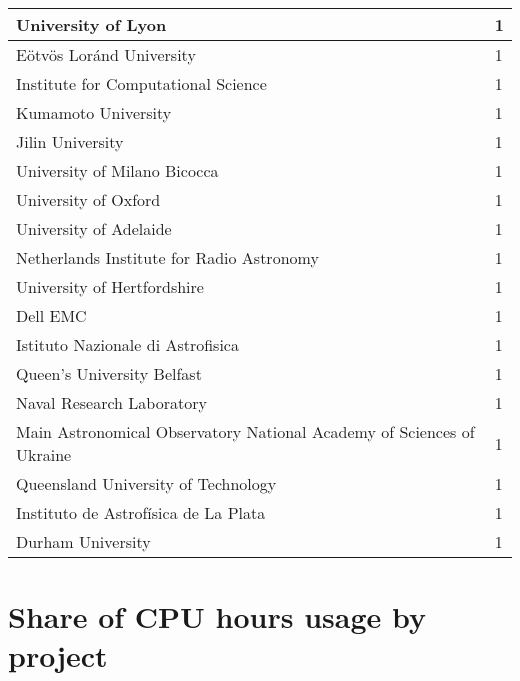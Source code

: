 \documentclass{article}%
\begin{document}
\begin{longtabu}{X[l] X[r]}
University of Lyon&1\\%
\hline%
Eötvös Loránd University&1\\%
\hline%
Institute for Computational Science&1\\%
\hline%
Kumamoto University&1\\%
\hline%
Jilin University&1\\%
\hline%
University of Milano Bicocca&1\\%
\hline%
University of Oxford&1\\%
\hline%
University of Adelaide&1\\%
\hline%
Netherlands Institute for Radio Astronomy&1\\%
\hline%
University of Hertfordshire&1\\%
\hline%
Dell EMC&1\\%
\hline%
Istituto Nazionale di Astrofisica&1\\%
\hline%
Queen's University Belfast&1\\%
\hline%
Naval Research Laboratory&1\\%
\hline%
Main Astronomical Observatory National Academy of Sciences of Ukraine&1\\%
\hline%
Queensland University of Technology&1\\%
\hline%
Instituto de Astrofísica de La Plata&1\\%
\hline%
Durham University&1\\%
\hline%
\end{longtabu}%
\section{Share of CPU hours usage by project}%
\end{document}
